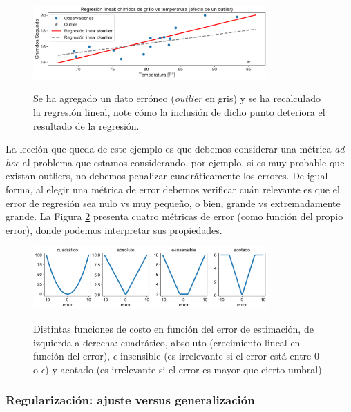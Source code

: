 \begin{figure}[H]
	\centering
	\includegraphics[width=0.8\textwidth]{img/cap2_chirridos_outlier.pdf}\\
	\caption{Se ha agregado un dato erróneo (\emph{outlier} en gris) y se ha recalculado la regresión lineal, note cómo la inclusión de dicho punto deteriora el resultado de la regresión.}
	\label{fig:reg_lin_2}
\end{figure}

La lección que queda de este ejemplo es que debemos considerar una métrica \emph{ad hoc} al problema que estamos considerando, por ejemplo, si es muy probable que existan outliers, no debemos penalizar cuadráticamente los errores. De igual forma, al elegir una métrica de error debemos verificar cuán relevante es que el error de regresión sea nulo vs muy pequeño, o bien,  grande vs extremadamente grande. La Figura \ref{fig:reg_lin_err} presenta cuatro métricas de error (como función del propio error), donde podemos interpretar sus propiedades. 

\begin{figure}[H]
	\centering
	\includegraphics[width=0.8\textwidth]{img/cap2_errores.pdf}\\
	\caption{Distintas funciones de costo en función del error de estimación, de izquierda a derecha: cuadrático, absoluto (crecimiento lineal en función del error), $\epsilon$-insensible (es irrelevante si el error está entre 0 o  $\epsilon$) y acotado (es irrelevante si el error es mayor que cierto umbral).}
	\label{fig:reg_lin_err}  
\end{figure}


\subsubsection{Regularización: ajuste versus generalización}
\label{sub:min_cuad_reg}

